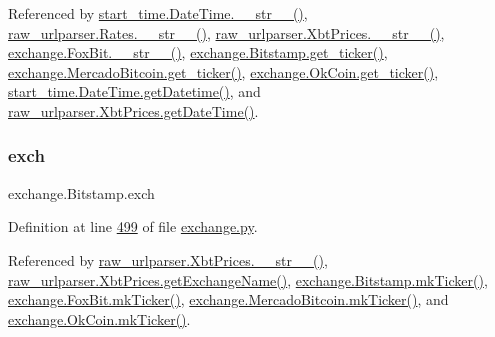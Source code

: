Referenced by \hyperlink{start__time_2____init_____8py_source_l00034}{start\+\_\+time.\+Date\+Time.\+\_\+\+\_\+str\+\_\+\+\_\+()}, \hyperlink{raw__urlparser_8py_source_l00038}{raw\+\_\+urlparser.\+Rates.\+\_\+\+\_\+str\+\_\+\+\_\+()}, \hyperlink{raw__urlparser_8py_source_l00074}{raw\+\_\+urlparser.\+Xbt\+Prices.\+\_\+\+\_\+str\+\_\+\+\_\+()}, \hyperlink{exchange_8py_source_l00610}{exchange.\+Fox\+Bit.\+\_\+\+\_\+str\+\_\+\+\_\+()}, \hyperlink{exchange_8py_source_l00511}{exchange.\+Bitstamp.\+get\+\_\+ticker()}, \hyperlink{exchange_8py_source_l00651}{exchange.\+Mercado\+Bitcoin.\+get\+\_\+ticker()}, \hyperlink{exchange_8py_source_l00716}{exchange.\+Ok\+Coin.\+get\+\_\+ticker()}, \hyperlink{start__time_2____init_____8py_source_l00031}{start\+\_\+time.\+Date\+Time.\+get\+Datetime()}, and \hyperlink{raw__urlparser_8py_source_l00059}{raw\+\_\+urlparser.\+Xbt\+Prices.\+get\+Date\+Time()}.

\mbox{\label{classexchange_1_1_bitstamp_a140f44d1638f2e50ecb5148bf8f8ac86}} 
\subsubsection{\texorpdfstring{exch}{exch}}
{\footnotesize\ttfamily exchange.\+Bitstamp.\+exch}



Definition at line \hyperlink{exchange_8py_source_l00499}{499} of file \hyperlink{exchange_8py_source}{exchange.\+py}.



Referenced by \hyperlink{raw__urlparser_8py_source_l00074}{raw\+\_\+urlparser.\+Xbt\+Prices.\+\_\+\+\_\+str\+\_\+\+\_\+()}, \hyperlink{raw__urlparser_8py_source_l00068}{raw\+\_\+urlparser.\+Xbt\+Prices.\+get\+Exchange\+Name()}, \hyperlink{exchange_8py_source_l00525}{exchange.\+Bitstamp.\+mk\+Ticker()}, \hyperlink{exchange_8py_source_l00584}{exchange.\+Fox\+Bit.\+mk\+Ticker()}, \hyperlink{exchange_8py_source_l00665}{exchange.\+Mercado\+Bitcoin.\+mk\+Ticker()}, and \hyperlink{exchange_8py_source_l00730}{exchange.\+Ok\+Coin.\+mk\+Ticker()}.

\mbox{\label{classexchange_1_1_bitstamp_a05de034d34b384373aeb26a28b60cad0}} 

